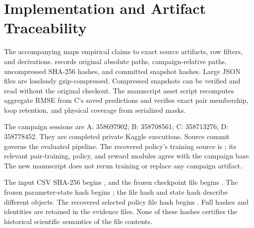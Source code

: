 \section{Implementation and Artifact Traceability}
The accompanying  maps empirical claims to exact source artifacts, row filters, and derivations.  records original absolute paths, campaign-relative paths, uncompressed SHA-256 hashes, and committed snapshot hashes. Large JSON files are losslessly gzip-compressed. Compressed snapshots can be verified and read without the original checkout. The manuscript asset script recomputes aggregate RMSE from C's saved predictions and verifies exact pair membership, loop retention, and physical coverage from serialized masks.

The campaign sessions are A: 358697902; B: 358708561; C: 358713276; D: 358778452. They are completed private Kaggle executions. Source commit  governs the evaluated pipeline. The recovered policy's training source is ; its relevant pair-training, policy, and reward modules agree with the campaign base. The new manuscript does not rerun training or replace any campaign artifact.

The input CSV SHA-256 begins , and the frozen checkpoint file begins . The frozen parameter-state hash begins ; the file hash and state hash describe different objects. The recovered selected policy file hash begins . Full hashes and identities are retained in the evidence files. None of these hashes certifies the historical scientific semantics of the file contents.

